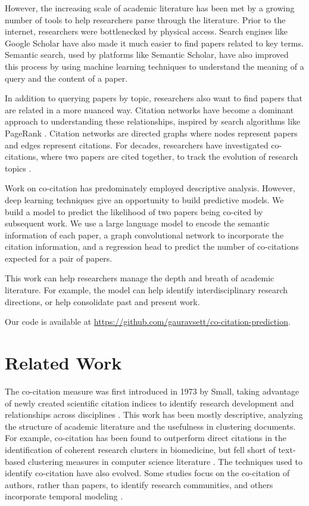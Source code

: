 \documentclass[10pt,twocolumn,letterpaper]{article}
\begin{document}
However, the increasing scale of academic literature has been met by a growing number of tools to help researchers parse through the literature. Prior to the internet, researchers were bottlenecked by physical access. Search engines like Google Scholar have also made it much easier to find papers related to key terms. Semantic search, used by platforms like Semantic Scholar, have also improved this process by using machine learning techniques to understand the meaning of a query and the content of a paper. 

In addition to querying papers by topic, researchers also want to find papers that are related in a more nuanced way. Citation networks have become a dominant approach to understanding these relationships, inspired by search algorithms like PageRank \cite{Page1999ThePC}. Citation networks are directed graphs where nodes represent papers and edges represent citations. For decades, researchers have investigated co-citations, where two papers are cited together, to track the evolution of research topics \cite{small1973co}.

Work on co-citation has predominately employed descriptive analysis. However, deep learning techniques give an opportunity to build predictive models. We build a model to predict the likelihood of two papers being co-cited by subsequent work. We use a large language model to encode the semantic information of each paper, a graph convolutional network to incorporate the citation information, and a regression head to predict the number of co-citations expected for a pair of papers.

This work can help researchers manage the depth and breath of academic literature. For example, the model can help identify interdisciplinary research directions, or help consolidate past and present work.

Our code is available at \url{https://github.com/gauravsett/co-citation-prediction}.

\section{Related Work}

The co-citation measure was first introduced in 1973 by Small, taking advantage of newly created scientific citation indices to identify research development and relationships across disciplines \cite{small1973co}. This work has been mostly descriptive, analyzing the structure of academic literature and the usefulness in clustering documents. For example, co-citation has been found to outperform direct citations in the identification of coherent research clusters in biomedicine, but fell short of text-based clustering measures in computer science literature \cite{Boyack2010CocitationAB}. The techniques used to identify co-citation have also evolved. Some studies focus on the co-citation of authors, rather than papers, to identify research communities, and others incorporate temporal modeling \cite{chen2010structure}. 
\end{document}
